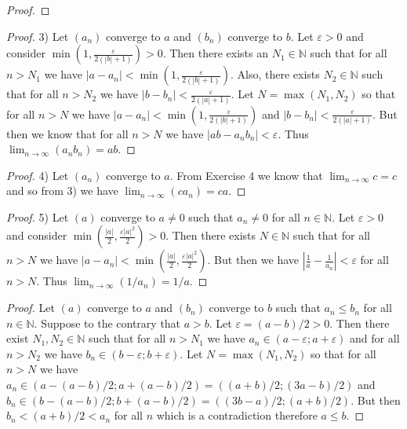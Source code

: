 \documentclass{article}
\begin{document}
\begin{flushleft}
\begin{proof}
\end{proof}
\begin{proof}
3) Let $(a_n)$ converge to $a$ and $(b_n)$ converge to $b$. Let $\varepsilon > 0$ and consider $\min \left ( 1, \frac{\varepsilon}{2 (|b|+1)} \right ) > 0$. Then there exists an $N_1 \in \mathbb{N}$ such that for all $n>N_1$ we have $|a-a_n| < \min \left (1, \frac{\varepsilon}{2 (|b| + 1)} \right )$. Also, there exists $N_2 \in \mathbb{N}$ such that for all $n>N_2$ we have $|b-b_n| < \frac{\varepsilon}{2 (|a|+1)}$. Let $N= \max(N_1,N_2)$ so that for all $n>N$ we have $|a-a_n| < \min \left (1, \frac{\varepsilon}{2(|b|+1)} \right )$ and $|b-b_n| < \frac{\varepsilon}{2(|a|+1)}$. But then we know that for all $n>N$ we have $|ab-a_nb_n| < \varepsilon$. Thus $\lim_{n \rightarrow \infty} (a_nb_n) = ab$.
\end{proof}
\begin{proof}
4) Let $(a_n)$ converge to $a$. From Exercise 4 we know that $\lim_{n \rightarrow \infty} c = c$ and so from 3) we have $\lim_{n \rightarrow \infty} (ca_n) = ca$.
\end{proof}
\begin{proof}
5) Let $(a)$ converge to $a \neq 0$ such that $a_n \neq 0$ for all $n \in \mathbb{N}$. Let $\varepsilon > 0$ and consider $\min \left ( \frac{|a|}{2}, \frac{\varepsilon |a|^2}{2} \right ) > 0$. Then there exists $N \in \mathbb{N}$ such that for all $n>N$ we have $|a-a_n| < \min \left ( \frac{|a|}{2}, \frac{\varepsilon |a|^2}{2} \right )$. But then we have $\left | \frac{1}{a} - \frac{1}{a_n} \right | < \varepsilon$ for all $n>N$. Thus $\lim_{n \rightarrow \infty} (1/a_n)=1/a$.
\end{proof}
\begin{proof}
Let $(a)$ converge to $a$ and $(b_n)$ converge to $b$ such that $a_n \leq b_n$ for all $n \in \mathbb{N}$. Suppose to the contrary that $a > b$. Let $\varepsilon = (a-b)/2 > 0$. Then there exist $N_1,N_2 \in \mathbb{N}$ such that for all $n>N_1$ we have $a_n \in (a - \varepsilon ; a + \varepsilon)$ and for all $n>N_2$ we have $b_n \in (b - \varepsilon ; b + \varepsilon)$. Let $N=\max (N_1,N_2)$ so that for all $n>N$ we have $a_n \in (a - (a-b)/2 ; a + (a-b)/2) = ((a+b)/2 ; (3a-b)/2)$ and $b_n \in (b - (a-b)/2 ; b + (a-b)/2) = ((3b-a)/2 ; (a+b)/2)$. But then $b_n < (a+b)/2 < a_n$ for all $n$ which is a contradiction therefore $a \leq b$.
\end{proof}


\end{flushleft}
\end{document}
